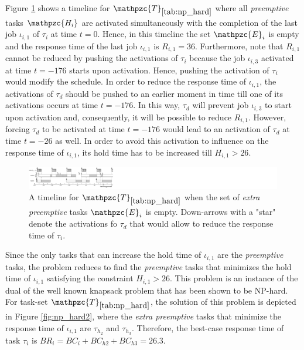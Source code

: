 \documentclass[fleqn]{article}
\begin{document}
Figure \ref{fig:np_hard1} shows a timeline for $\mathpzc{T}_{\ref{tab:np_hard}}$ where all \textit{preemptive} tasks $\mathpzc{H_i}$ are activated simultaneously with the completion of the last job $\iota_{i,1}$ of $\tau_i$ at time $t=0$. Hence, in this timeline the set $\mathpzc{E}_i$ is empty and the response time of the last job $\iota_{i,1}$ is $R_{i,1}=36$. Furthermore, note that $R_{i,1}$ cannot be reduced by pushing the activations of $\tau_i$ because  the job $\iota_{i,3}$ activated at time $t=-176$ starts upon activation. Hence, pushing the activation of $\tau_i$ would modify the schedule. In order to reduce the response time of $\iota_{i,1}$, the activations of $\tau_d$ should be pushed to an earlier moment in time till one of its activations occurs at time $t=-176$. In this way, $\tau_d$ will prevent job $\iota_{i,3}$ to start upon activation and, consequently, it will be possible to reduce $R_{i,1}$. However, forcing $\tau_d$ to be activated at time $t=-176$ would lead to an activation of $\tau_d$ at time $t=-26$ as well. In order to avoid this activation to influence on the response time of $\iota_{i,1}$, its hold time has to be increased till $H_{i,1} > 26$.

\begin{figure}[H]
	\centering
	\includegraphics[width=1\linewidth]{figures/multiple_tasks}
	\caption{A timeline for $\mathpzc{T}_{\ref{tab:np_hard}}$ when the set of \textit{extra preemptive} tasks $\mathpzc{E}_i$ is empty. Down-arrows with a "star" denote the activations fo $\tau_d$ that would allow to reduce the response time of $\tau_i$.}
	\label{fig:np_hard1}
\end{figure}

Since the only tasks that can increase the hold time of $\iota_{i,1}$ are the \textit{preemptive} tasks, the problem reduces to find the \textit{preemptive} tasks that minimizes the hold time of  $\iota_{i,1}$ satisfying the constraint $H_{i,1} > 26$. This problem is an instance of the dual of the well known knapsack problem that has been shown to be NP-hard. For task-set $\mathpzc{T}_{\ref{tab:np_hard}}$, the solution of this problem is depicted in Figure \ref{fig:np_hard2}, where the \textit{extra preemptive} tasks that minimize the response time of $\iota_{i,1}$ are $\tau_{h_2}$ and $\tau_{h_3}$. Therefore, the best-case response time of task $\tau_i$ is $BR_i = BC_i+BC_{h2}+BC_{h3} =26.3$.
\end{document}
